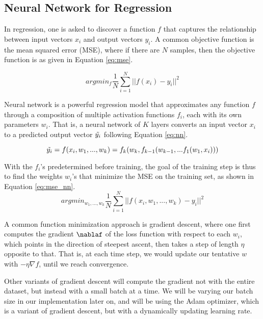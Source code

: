 \documentclass[letterpaper, 10 pt, conference]{ieeeconf}  %
\begin{document}
\subsection{Neural Network for Regression}
\label{section:nn_regression}
In regression, one is asked to discover a function $f$ that captures the relationship between input vectors $x_i$ and output vectors $y_i$.
A common objective function is the mean squared error (MSE), where if there are $N$ samples, then the objective function is as given in Equation \ref{eq:mse}.

\begin{equation}
\label{eq:mse}
argmin_f \frac{1}{N} \sum_{i=1}^{N}||f(x_i) - y_i||^2
\end{equation}

Neural network is a powerful regression model that approximates any function $f$ through a composition of multiple activation functions $f_i$, each with its own parameters $w_i$. That is, a neural network of $K$ layers converts an input vector $x_i$ to a predicted output vector $\Tilde{y_i}$ following Equation \ref{eq:nn}.

\begin{equation}
\label{eq:nn}
\Tilde{y_i} = f(x_i, w_1, ..., w_k) = f_k(w_k, f_{k-1}(w_{k-1}, ... f_1(w_1, x_i)))
\end{equation}

With the $f_i$'s predetermined before training, the goal of the training step is thus to find the weights $w_i$'s that minimize the MSE on the training set, as shown in Equation \ref{eq:mse_nn}.
\begin{equation}
\label{eq:mse_nn}
argmin_{w_1, ..., w_k} \frac{1}{N} \sum_{i=1}^{N}||f(x_i, w_1, ..., w_k) - y_i||^2
\end{equation}

A common function minimization approach is gradient descent, where one first computes the gradient $\nablaf$ of the loss function with respect to each $w_i$, which points in the direction of steepest ascent, then takes a step of length $\eta$ opposite to that. That is, at each time step, we would update our tentative $w$ with $-\eta \nabla f$, until we reach convergence.

Other variants of gradient descent will compute the gradient not with the entire dataset, but instead with a small batch at a time. We will be varying our batch size in our implementation later on, and will be using the Adam \cite{kingma2014adam} optimizer, which is a variant of gradient descent, but with a dynamically updating learning rate. 
\end{document}
